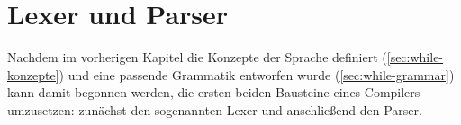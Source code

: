 \chapter{Lexer und Parser}
Nachdem im vorherigen Kapitel die Konzepte der Sprache definiert (\cref{sec:while-konzepte}) und eine passende Grammatik entworfen wurde (\cref{sec:while-grammar}) kann damit begonnen werden, die ersten beiden Bausteine eines Compilers umzusetzen: zunächst den sogenannten Lexer und anschließend den Parser.






%